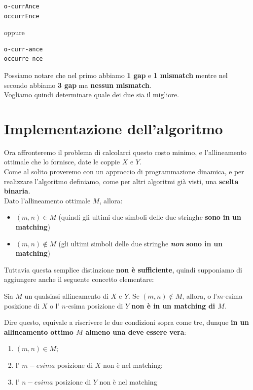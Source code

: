 \begin{verbatim}
o-currAnce
occurrEnce
\end{verbatim}

oppure

\begin{verbatim}
o-curr-ance
occurre-nce
\end{verbatim}

Possiamo notare che nel primo abbiamo \textbf{1 gap} e \textbf{1
  mismatch} mentre nel secondo abbiamo \textbf{3 gap} ma \textbf{nessun
  mismatch}.\\
Vogliamo quindi determinare quale dei due sia il migliore.

\section{Implementazione dell'algoritmo}

Ora affronteremo il problema di calcolarci questo costo minimo, e
l'allineamento ottimale che lo fornisce, date le coppie $X$ e $Y$.\\
Come al solito proveremo con un approccio di programmazione dinamica, e
per realizzare l'algoritmo definiamo, come per altri algoritmi già
visti, una \textbf{scelta binaria}.\\ Dato l'allineamento ottimale $M$,
allora:
\begin{itemize}
  \item $(m,n) \in M$ (quindi gli ultimi due simboli delle due
        stringhe \textbf{sono in un matching})
  \item $(m,n) \notin M$ (gli ultimi
        simboli delle due stringhe \textbf{\emph{non} sono in un matching})
\end{itemize}

Tuttavia questa semplice distinzione \textbf{non è sufficiente}, quindi
supponiamo di aggiungere anche il seguente concetto elementare:
\begin{myblockquote}
  Sia $M$ un qualsiasi allineamento di $X$ e $Y$. Se $(m,n) \notin M$, allora,
  o l'$m$-esima posizione di $X$ o l' $n$-esima posizione di $Y$ \textbf{non è
    in un matching di $M$}.
\end{myblockquote}

Dire questo, equivale a riscrivere le due condizioni sopra come tre,
dunque \textbf{in un allineamento ottimo $M$ almeno una deve essere
  vera}:
\begin{enumerate}
  \item $(m,n) \in M$;
  \item l' $m-esima$ posizione di $X$ non è nel matching;
  \item l' $n-esima$ posizione di $Y$ non è nel matching
\end{enumerate}

